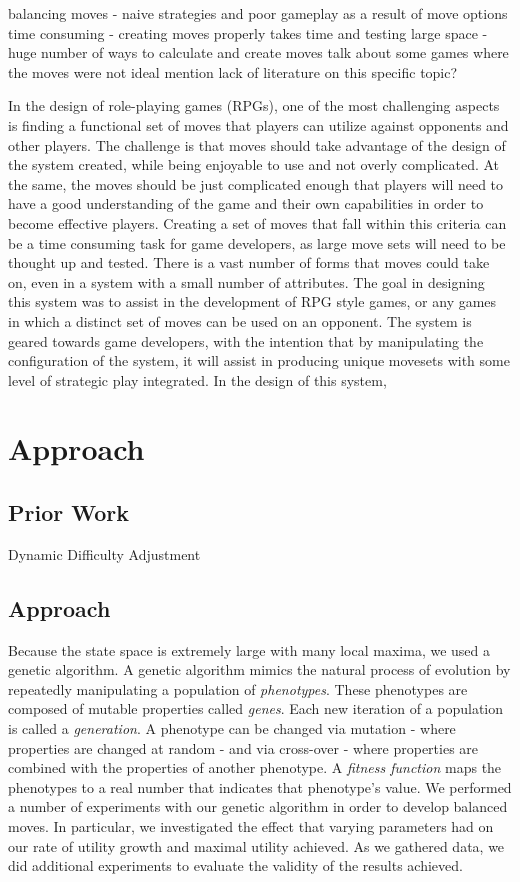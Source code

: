\documentclass{acm_proc_article-sp}
\begin{document}
balancing moves - naive strategies and poor gameplay as a result of move options
time consuming - creating moves properly takes time and testing
large space - huge number of ways to calculate and create moves
talk about some games where the moves were not ideal
mention lack of literature on this specific topic?

In the design of role-playing games (RPGs), one of the most challenging aspects is finding a functional set of moves that players can utilize against opponents and other players. The challenge is that moves should take advantage of the design of the system created, while being enjoyable to use and not overly complicated. At the same, the moves should be just complicated enough that players will need to have a good understanding of the game and their own capabilities in order to become effective players. Creating a set of moves that fall within this criteria can be a time consuming task for game developers, as large move sets will need to be thought up and tested. There is a vast number of forms that moves could take on, even in a system with a small number of attributes.
The goal in designing this system was to assist in the development of RPG style games, or any games in which a distinct set of moves can be used on an opponent. The system is geared towards game developers, with the intention that by manipulating the configuration of the system, it will assist in producing unique movesets with some level of strategic play integrated.
In the design of this system, 

\section{Approach}

\subsection{Prior Work}

Dynamic Difficulty Adjustment	

\subsection{Approach}

Because the state space is extremely large with many local maxima, we used a genetic algorithm. A genetic algorithm mimics the natural process of evolution by repeatedly manipulating a population of \textit{phenotypes}. These phenotypes are composed of mutable properties called \textit{genes}. Each new iteration of a population is called a \textit{generation}. A phenotype can be changed via mutation - where properties are changed at random - and via cross-over - where properties are combined with the properties of another phenotype. A \textit{fitness function} maps the phenotypes to a real number that indicates that phenotype’s value. 
We performed a number of experiments with our genetic algorithm in order to develop balanced moves. In particular, we investigated the effect that varying parameters had on our rate of utility growth and maximal utility achieved. As we gathered data, we did additional experiments to evaluate the validity of the results achieved.
\end{document}
